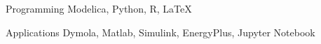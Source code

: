\vspace{-1.0cm}



\begin{cvskills}

  \cvskill
    {Programming} %
    {Modelica, Python, R, \LaTeX} %

\cvskill
  {Applications}
  {Dymola, Matlab, Simulink, EnergyPlus, Jupyter Notebook}




\end{cvskills}
